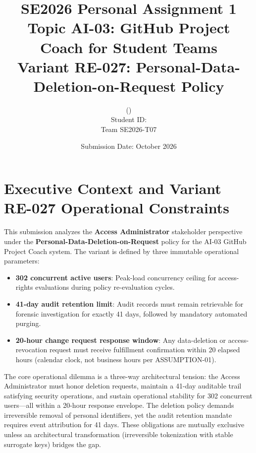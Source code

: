 \documentclass[10pt,a4paper]{article}
\title{\textbf{SE2026 Personal Assignment 1}\\
\large Topic AI-03: GitHub Project Coach for Student Teams\\
\large Variant RE-027: Personal-Data-Deletion-on-Request Policy}
\author{\StudentNameEn{} (\StudentNameVi)\\
Student ID: \StudentID\\
Team SE2026-T07}
\date{Submission Date: October 2026}
\begin{document}
\maketitle
\thispagestyle{fancy}

\begin{center}
\end{center}

\vspace{8pt}

\section{Executive Context and Variant RE-027 Operational Constraints}

This submission analyzes the \textbf{Access Administrator} stakeholder perspective under the \textbf{Personal-Data-Deletion-on-Request} policy for the AI-03 GitHub Project Coach system. The variant is defined by three immutable operational parameters:

\begin{itemize}[leftmargin=*]
 \item \textbf{302 concurrent active users}: Peak-load concurrency ceiling for access-rights evaluations during policy re-evaluation cycles.
 \item \textbf{41-day audit retention limit}: Audit records must remain retrievable for forensic investigation for exactly 41 days, followed by mandatory automated purging.
 \item \textbf{20-hour change request response window}: Any data-deletion or access-revocation request must receive fulfillment confirmation within 20 elapsed hours (calendar clock, not business hours per ASSUMPTION-01).
\end{itemize}

The core operational dilemma is a three-way architectural tension: the Access Administrator must honor deletion requests, maintain a 41-day auditable trail satisfying security operations, and sustain operational stability for 302 concurrent users---all within a 20-hour response envelope. The deletion policy demands irreversible removal of personal identifiers, yet the audit retention mandate requires event attribution for 41 days. These obligations are mutually exclusive unless an architectural transformation (irreversible tokenization with stable surrogate keys) bridges the gap.
\end{document}
